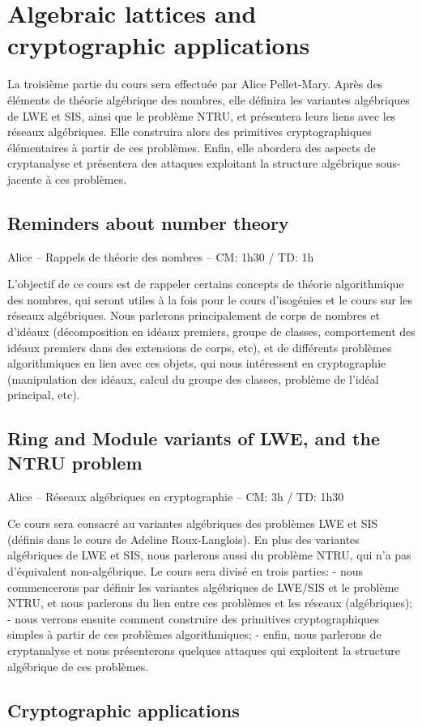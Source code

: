 \section{Algebraic lattices and cryptographic applications}

La troisième partie du cours sera effectuée par Alice Pellet-Mary. Après des
éléments de théorie algébrique des nombres, elle définira les variantes
algébriques de LWE et SIS, ainsi que le problème NTRU,
et présentera leurs liens avec les réseaux algébriques. Elle construira alors
des primitives cryptographiques élémentaires à partir de ces problèmes.
Enfin, elle abordera des aspects de cryptanalyse et présentera des attaques
exploitant la structure algébrique sous-jacente à ces problèmes.


\subsection{Reminders about number theory}

Alice -- Rappels de théorie des nombres -- CM: 1h30 / TD: 1h

L'objectif de ce cours est de rappeler certains concepts de théorie algorithmique des nombres, qui seront utiles à la fois pour le cours d'isogénies et le cours sur les réseaux algébriques. Nous parlerons principalement de corps de nombres et d'idéaux (décomposition en idéaux premiers, groupe de classes, comportement des idéaux premiers dans des extensions de corps, etc), et de différents problèmes algorithmiques en lien avec ces objets, qui nous intéressent en cryptographie (manipulation des idéaux, calcul du groupe des classes, problème de l'idéal principal, etc).


\subsection{Ring and Module variants of LWE, and the NTRU problem}

Alice -- Réseaux algébriques en cryptographie -- CM: 3h / TD: 1h30

Ce cours sera consacré au variantes algébriques des problèmes LWE et SIS (définis dans le cours de Adeline Roux-Langlois). En plus des variantes algébriques de LWE et SIS, nous parlerons aussi du problème NTRU, qui n'a pas d'équivalent non-algébrique.
Le cours sera divisé en trois parties:
- nous commencerons par définir les variantes algébriques de LWE/SIS et le problème NTRU, et nous parlerons du lien entre ces problèmes et les réseaux (algébriques);
- nous verrons ensuite comment construire des primitives cryptographiques simples à partir de ces problèmes algorithmiques;
- enfin, nous parlerons de cryptanalyse et nous présenterons quelques attaques qui exploitent la structure algébrique de ces problèmes.

\subsection{Cryptographic applications}